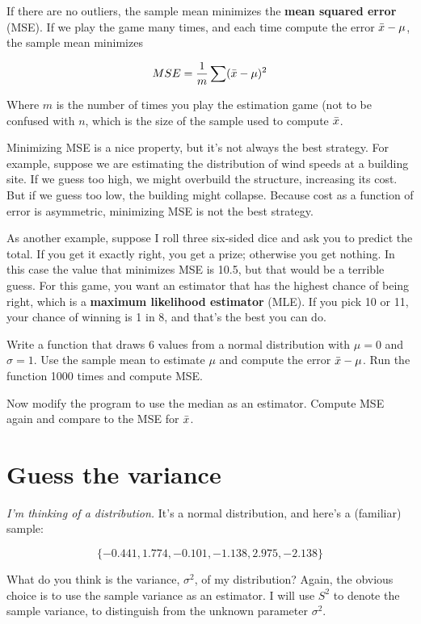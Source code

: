 \documentclass[12pt]{book}
\begin{document}
If there are no outliers, the sample mean minimizes the {\bf mean squared
error} (MSE).  If we play the game many times, and each time
compute the error $\bar{x} - \mu$, the sample mean minimizes

\[ MSE = \frac{1}{m} \sum (\bar{x} - \mu)^2 \]

Where $m$ is the number of times you play the estimation game (not to
be confused with $n$, which is the size of the sample used to compute
$\bar{x}$. 

Minimizing MSE is a nice property, but it's not always the best
strategy.  For example, suppose we are estimating the distribution of
wind speeds at a building site.  If we guess too high, we might
overbuild the structure, increasing its cost.  But if we guess too
low, the building might collapse.  Because cost as a function of
error is asymmetric, minimizing MSE is not the best strategy.

As another example, suppose I roll three six-sided dice and ask you
to predict the total.  If you get it exactly right, you get a prize;
otherwise you get nothing.  In this case the value that minimizes MSE
is 10.5, but that would be a terrible guess.  For this game, you
want an estimator that has the highest chance of being right, which is
a {\bf maximum likelihood estimator} (MLE).  If you pick 10 or 11, your
chance of winning is 1 in 8, and that's the best you can do.

\begin{ex}

Write a function that draws 6 values from a normal distribution with
$\mu=0$ and $\sigma=1$.  Use the sample mean to estimate $\mu$ and
compute the error $\bar{x} - \mu$.  Run the function 1000 times and
compute MSE.

Now modify the program to use the median as an
estimator.  Compute MSE again and compare to the MSE for $\bar{x}$.

\end{ex}


\section{Guess the variance}

{\em I'm thinking of a distribution.}  It's a normal distribution, and 
here's a (familiar) sample:

\[ \{ -0.441, 1.774, -0.101, -1.138, 2.975, -2.138 \} \]

What do you think is the variance, $\sigma^2$, of my distribution?
Again, the obvious choice is to use the sample variance as an estimator.
I will use $S^2$ to denote the sample variance, to distinguish from the
unknown parameter $\sigma^2$.
\end{document}
